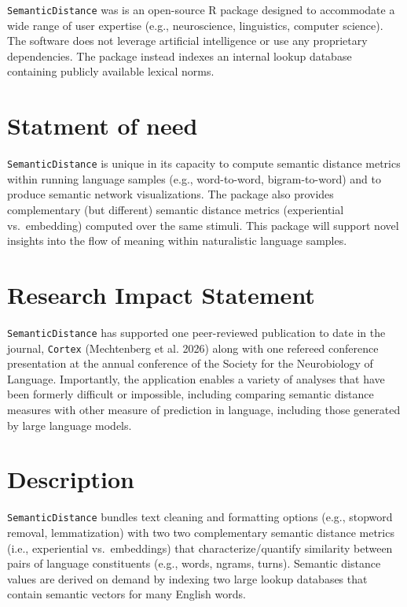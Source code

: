 \documentclass[10pt,a4paper,onecolumn]{article}
\begin{document}
\texttt{SemanticDistance} was is an open-source R package designed to
accommodate a wide range of user expertise (e.g., neuroscience,
linguistics, computer science). The software does not leverage
artificial intelligence or use any proprietary dependencies. The package
instead indexes an internal lookup database containing publicly
available lexical norms.

\section{Statment of need}\label{statment-of-need}

\texttt{SemanticDistance} is unique in its capacity to compute semantic
distance metrics within running language samples (e.g., word-to-word,
bigram-to-word) and to produce semantic network visualizations. The
package also provides complementary (but different) semantic distance
metrics (experiential vs.~embedding) computed over the same stimuli.
This package will support novel insights into the flow of meaning within
naturalistic language samples.

\section{Research Impact Statement}\label{research-impact-statement}

\texttt{SemanticDistance} has supported one peer-reviewed publication to
date in the journal, \texttt{Cortex} (Mechtenberg et al. 2026) along
with one refereed conference presentation at the annual conference of
the Society for the Neurobiology of Language. Importantly, the
application enables a variety of analyses that have been formerly
difficult or impossible, including comparing semantic distance measures
with other measure of prediction in language, including those generated
by large language models.

\section{Description}\label{description}

\texttt{SemanticDistance} bundles text cleaning and formatting options
(e.g., stopword removal, lemmatization) with two two complementary
semantic distance metrics (i.e., experiential vs.~embeddings) that
characterize/quantify similarity between pairs of language constituents
(e.g., words, ngrams, turns). Semantic distance values are derived on
demand by indexing two large lookup databases that contain semantic
vectors for many English words.\newline   
\end{document}
